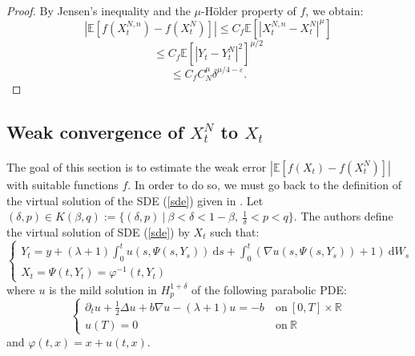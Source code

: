 \documentclass[12pt]{article}
\newcommand{\R}{\mathbb{R}}
\newcommand{\E}{\mathbb{E}}
\newcommand{\di}{\mathrm{d}}
\begin{document}
        \begin{proof}
            By Jensen's inequality and the $\mu$-Hölder property of $f$, we obtain:
            \begin{equation*}
            \left|\E\left[f\left(X_t^{N,n}\right)-f\left(X_t^N\right)\right]\right| \leq C_f  \E\left[\left|X_t^{N,n}-X_t^N\right|^\mu\right]
            \end{equation*}
            \begin{equation*}
             \leq  C_f  \E\left[\left|Y_t-Y_t^N\right|^2\right]^{\mu/2}
            \end{equation*}
            \begin{equation*}
            \leq C_f  C_N^\mu\delta^{\mu/4-\varepsilon}.
            \end{equation*}
        \end{proof}
    
    \subsection{Weak convergence of $X^{N}_t$ to $X_t$}
        \paragraph{}
        The goal of this section is to estimate the weak error $\left|\E\left[f\left(X_t\right)-f\left(X_t^N\right)\right]\right|$ with suitable functions $f$. In order to do so, we must go back to the definition of the virtual solution of the SDE (\ref{sde}) given in \cite{Fla-Iss-Rus-2017}. Let $(\delta,p)\in K(\beta,q):=\{(\delta,p)\ |\ \beta<\delta<1-\beta,\ \frac{1}{\delta}<p<q\}$. The authors define the virtual solution of SDE (\ref{sde}) by $X_t$ such that:
        \begin{equation}\label{virtual}
        \begin{cases}
        Y_t = y + (\lambda+1)\int_0^t u(s,\Psi\left(s,Y_s\right))\ \di s +\int_0^t (\nabla u(s,\Psi\left(s,Y_s\right))+1)\ \di W_s \\X_t = \Psi(t,Y_t) = \varphi^{-1}(t,Y_t)
        \end{cases}
        \end{equation}
        where $u$ is the mild solution in $H_p^{1+\delta}$ of the following parabolic PDE:
        \begin{equation}\label{pde}
        \begin{cases}
        \partial_t u + \frac{1}{2}\Delta u + b\nabla u - (\lambda+1)u = -b\ &\mathrm{on}\ [0,T]\times\R\\
        u(T) = 0\ &\mathrm{on}\ \R
        \end{cases}
        \end{equation}
        and $\varphi(t,x) = x + u(t,x)$.
        
\end{document}
